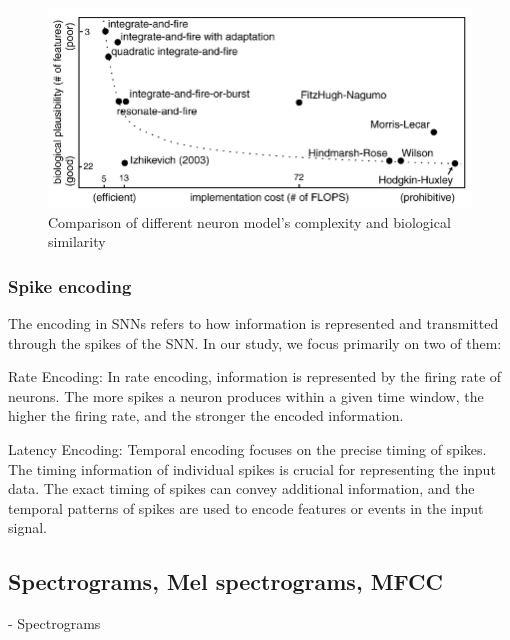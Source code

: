 \documentclass[11pt]{article}
\begin{document}
\begin{figure}[h]
  \centering
  \begin{minipage}{0.9\textwidth}
    \centering
    \includegraphics[width=1\textwidth]{"image/comparison_neuron.png"}
    \caption{Comparison of different neuron model's complexity and biological similarity}
    \label{fig:neuron_comparison}
  \end{minipage}\hfill
\end{figure}



\subsubsection{Spike encoding}

The encoding in SNNs refers to how information is represented and transmitted through the spikes of the SNN. In our study, we focus primarily on two of them:

    Rate Encoding:
    In rate encoding, information is represented by the firing rate of neurons. The more spikes a neuron produces within a given time window, the higher the firing rate, and the stronger the encoded information.


    Latency Encoding:
    Temporal encoding focuses on the precise timing of spikes. The timing information of individual spikes is crucial for representing the input data.
    The exact timing of spikes can convey additional information, and the temporal patterns of spikes are used to encode features or events in the input signal.




\subsection{Spectrograms, Mel spectrograms, MFCC}


    - Spectrograms
\end{document}
